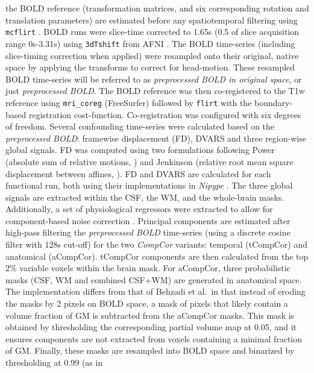 \documentclass[
]{article}
\begin{document}
\begin{description}
the BOLD reference (transformation matrices, and six corresponding
rotation and translation parameters) are estimated before any
spatiotemporal filtering using \texttt{mcflirt} \citep[FSL
6.0.5.1:57b01774,][]{mcflirt}. BOLD runs were slice-time corrected to
1.65s (0.5 of slice acquisition range 0s-3.31s) using \texttt{3dTshift}
from AFNI \citep[RRID:SCR\_005927]{afni}. The BOLD time-series
(including slice-timing correction when applied) were resampled onto
their original, native space by applying the transforms to correct for
head-motion. These resampled BOLD time-series will be referred to as
\emph{preprocessed BOLD in original space}, or just \emph{preprocessed
BOLD}. The BOLD reference was then co-registered to the T1w reference
using \texttt{mri\_coreg} (FreeSurfer) followed by \texttt{flirt}
\citep[FSL 6.0.5.1:57b01774,][]{flirt} with the boundary-based
registration \citep{bbr} cost-function. Co-registration was configured
with six degrees of freedom. Several confounding time-series were
calculated based on the \emph{preprocessed BOLD}: framewise displacement
(FD), DVARS and three region-wise global signals. FD was computed using
two formulations following Power (absolute sum of relative motions,
\citet{power_fd_dvars}) and Jenkinson (relative root mean square
displacement between affines, \citet{mcflirt}). FD and DVARS are
calculated for each functional run, both using their implementations in
\emph{Nipype} \citep[following the definitions by][]{power_fd_dvars}.
The three global signals are extracted within the CSF, the WM, and the
whole-brain masks. Additionally, a set of physiological regressors were
extracted to allow for component-based noise correction
\citep[\emph{CompCor},][]{compcor}. Principal components are estimated
after high-pass filtering the \emph{preprocessed BOLD} time-series
(using a discrete cosine filter with 128s cut-off) for the two
\emph{CompCor} variants: temporal (tCompCor) and anatomical (aCompCor).
tCompCor components are then calculated from the top 2\% variable voxels
within the brain mask. For aCompCor, three probabilistic masks (CSF, WM
and combined CSF+WM) are generated in anatomical space. The
implementation differs from that of Behzadi et al.~in that instead of
eroding the masks by 2 pixels on BOLD space, a mask of pixels that
likely contain a volume fraction of GM is subtracted from the aCompCor
masks. This mask is obtained by thresholding the corresponding partial
volume map at 0.05, and it ensures components are not extracted from
voxels containing a minimal fraction of GM. Finally, these masks are
resampled into BOLD space and binarized by thresholding at 0.99 (as in

\end{description}
\end{document}
